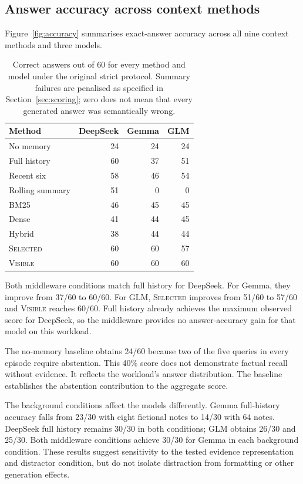 \documentclass[11pt,a4paper]{article}
\newcommand{\sel}{\textsc{Selected}}
\newcommand{\vis}{\textsc{Visible}}
\begin{document}
\subsection{Answer accuracy across context methods}
Figure~\ref{fig:accuracy} summarises exact-answer accuracy across all nine context methods and three models.
\begin{table}[ht]
\centering
\begin{tabular}{lrrr}
\toprule
Method & DeepSeek & Gemma & GLM \\
\midrule
No memory & 24 & 24 & 24 \\
Full history & 60 & 37 & 51 \\
Recent six & 58 & 46 & 54 \\
Rolling summary & 51 & 0 & 0 \\
BM25 & 46 & 45 & 45 \\
Dense & 41 & 44 & 45 \\
Hybrid & 38 & 44 & 44 \\
\sel{} & 60 & 60 & 57 \\
\vis{} & 60 & 60 & 60 \\
\bottomrule
\end{tabular}
\caption{Correct answers out of 60 for every method and model under the original strict protocol. Summary failures are penalised as specified in Section~\ref{sec:scoring}; zero does not mean that every generated answer was semantically wrong.}
\label{tab:accuracy}
\end{table}

Both middleware conditions match full history for DeepSeek. For Gemma, they improve from 37/60 to 60/60. For GLM, \sel{} improves from 51/60 to 57/60 and \vis{} reaches 60/60. Full history already achieves the maximum observed score for DeepSeek, so the middleware provides no answer-accuracy gain for that model on this workload.

The no-memory baseline obtains 24/60 because two of the five queries in every episode require abstention. This 40\% score does not demonstrate factual recall without evidence. It reflects the workload's answer distribution. The baseline establishes the abstention contribution to the aggregate score.

The background conditions affect the models differently. Gemma full-history accuracy falls from 23/30 with eight fictional notes to 14/30 with 64 notes. DeepSeek full history remains 30/30 in both conditions; GLM obtains 26/30 and 25/30. Both middleware conditions achieve 30/30 for Gemma in each background condition. These results suggest sensitivity to the tested evidence representation and distractor condition, but do not isolate distraction from formatting or other generation effects.
\end{document}
